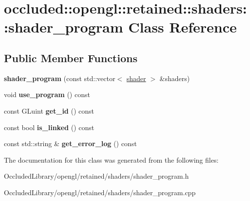 \hypertarget{classoccluded_1_1opengl_1_1retained_1_1shaders_1_1shader__program}{\section{occluded\+:\+:opengl\+:\+:retained\+:\+:shaders\+:\+:shader\+\_\+program Class Reference}
\label{classoccluded_1_1opengl_1_1retained_1_1shaders_1_1shader__program}
}
\subsection*{Public Member Functions}
\begin{DoxyCompactItemize}
\item 
\hypertarget{classoccluded_1_1opengl_1_1retained_1_1shaders_1_1shader__program_ab866c58d6541142d873e0ec532fd194a}{{\bfseries shader\+\_\+program} (const std\+::vector$<$ \hyperlink{classoccluded_1_1opengl_1_1retained_1_1shaders_1_1shader}{shader} $>$ \&shaders)}\label{classoccluded_1_1opengl_1_1retained_1_1shaders_1_1shader__program_ab866c58d6541142d873e0ec532fd194a}

\item 
\hypertarget{classoccluded_1_1opengl_1_1retained_1_1shaders_1_1shader__program_a477e65af748d916f6769e0518788b014}{void {\bfseries use\+\_\+program} () const }\label{classoccluded_1_1opengl_1_1retained_1_1shaders_1_1shader__program_a477e65af748d916f6769e0518788b014}

\item 
\hypertarget{classoccluded_1_1opengl_1_1retained_1_1shaders_1_1shader__program_ae98855d53b3ef7f8c147704e32e774aa}{const G\+Luint {\bfseries get\+\_\+id} () const }\label{classoccluded_1_1opengl_1_1retained_1_1shaders_1_1shader__program_ae98855d53b3ef7f8c147704e32e774aa}

\item 
\hypertarget{classoccluded_1_1opengl_1_1retained_1_1shaders_1_1shader__program_af713d427fa3e7a05ccee96cee435a100}{const bool {\bfseries is\+\_\+linked} () const }\label{classoccluded_1_1opengl_1_1retained_1_1shaders_1_1shader__program_af713d427fa3e7a05ccee96cee435a100}

\item 
\hypertarget{classoccluded_1_1opengl_1_1retained_1_1shaders_1_1shader__program_af2eb6bffe5e771bf47013086ace9d16f}{const std\+::string \& {\bfseries get\+\_\+error\+\_\+log} () const }\label{classoccluded_1_1opengl_1_1retained_1_1shaders_1_1shader__program_af2eb6bffe5e771bf47013086ace9d16f}

\end{DoxyCompactItemize}


The documentation for this class was generated from the following files\+:\begin{DoxyCompactItemize}
\item 
Occluded\+Library/opengl/retained/shaders/shader\+\_\+program.\+h\item 
Occluded\+Library/opengl/retained/shaders/shader\+\_\+program.\+cpp\end{DoxyCompactItemize}
